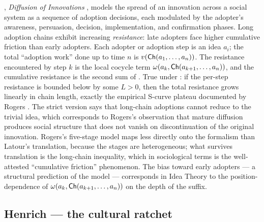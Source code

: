 \begin{zooentry*}
, \emph{Diffusion of Innovations}
\cite{Rogers2003}, models the spread of an innovation across a
social system as a sequence of adoption decisions, each modulated by
the adopter's awareness, persuasion, decision, implementation, and
confirmation phases. Long adoption chains exhibit increasing
\emph{resistance}: late adopters face higher cumulative friction
than early adopters.
\formalclaim Each adopter or adoption step is an idea $a_i$; the
total ``adoption work'' done up to time $n$ is
$v(\mathsf{Ch}(a_1,\dots,a_n))$. The resistance encountered by step $k$ is
the local cocycle term $\omega(a_k,\mathsf{Ch}(a_{k+1},\dots,a_n))$, and
the cumulative resistance is the second sum of .
\formalstatus
True under : if the per-step resistance is
bounded below by some $L>0$, then the total resistance grows
linearly in chain length, exactly the empirical S-curve plateau
documented by Rogers \cite{Rogers2003}. The strict version
 says that long-chain adoptions cannot reduce
to the trivial idea, which corresponds to Rogers's observation that
mature diffusion produces social structure that does not vanish on
discontinuation of the original innovation.
\litcomment
Rogers's five-stage model maps less directly onto the formalism than
Latour's translation, because the stages are heterogeneous; what
survives translation is the long-chain inequality, which in
sociological terms is the well-attested ``cumulative friction''
phenomenon. The bias toward early adopters --- a structural
prediction of the model --- corresponds in Idea Theory to the
position-dependence of $\omega(a_k, \mathsf{Ch}(a_{k+1},\dots,a_n))$ on
the depth of the suffix.
\end{zooentry*}

\subsection{Henrich --- the cultural ratchet}\label{zoo:henrich}

